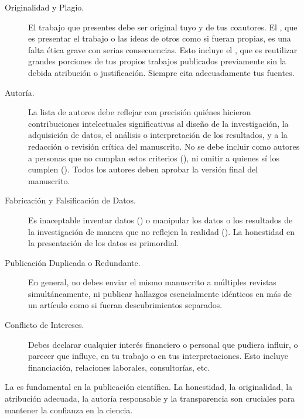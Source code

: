 \begin{description} \item[Originalidad y Plagio.] El trabajo que presentes debe ser original tuyo y de tus coautores.
	      El , que es presentar el trabajo o las ideas de otros como si fueran propias, es una falta ética grave con serias consecuencias.
	      Esto incluye el , que es reutilizar grandes porciones de tus propios trabajos publicados previamente sin la debida atribución o justificación.
	      Siempre cita adecuadamente tus fuentes.

	\item[Autoría.] La lista de autores debe reflejar con precisión quiénes hicieron contribuciones intelectuales significativas al diseño de la investigación, la adquisición de datos, el análisis o interpretación de los resultados, y a la redacción o revisión crítica del manuscrito.
	      No se debe incluir como autores a personas que no cumplan estos criterios (), ni omitir a quienes sí los cumplen ().
	      Todos los autores deben aprobar la versión final del manuscrito.

	\item[Fabricación y Falsificación de Datos.] Es inaceptable inventar datos () o manipular los datos o los resultados de la investigación de manera que no reflejen la realidad ().
	      La honestidad en la presentación de los datos es primordial.

	\item[Publicación Duplicada o Redundante.] En general, no debes enviar el mismo manuscrito a múltiples revistas simultáneamente, ni publicar hallazgos esencialmente idénticos en más de un artículo como si fueran descubrimientos separados.

	\item[Conflicto de Intereses.] Debes declarar cualquier interés financiero o personal que pudiera influir, o parecer que influye, en tu trabajo o en tus interpretaciones.
	      Esto incluye financiación, relaciones laborales, consultorías, etc. \end{description}

\begin{remember}
	\label{rem:eticaarticulo}
	La  es fundamental en la
	publicación científica.
	La honestidad, la originalidad, la atribución adecuada, la autoría
	responsable y la transparencia son cruciales para mantener la confianza en
	la ciencia.
\end{remember}


